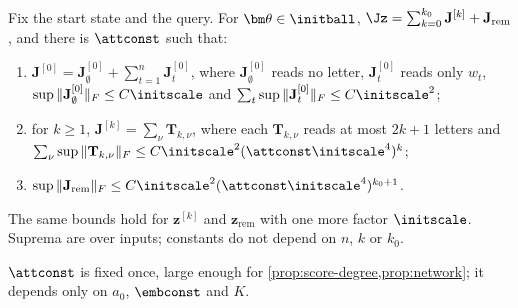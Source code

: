 \begin{proposition}
\label{prop:score-degree}
Fix the start state and the query. For $\bm\theta\in\initball$, $\Jz=\sum_{k=0}^{k_0}\mathbf J^{[k]}+\mathbf J_{\mathrm{rem}}$, and there is $\attconst$ such that:
\begin{enumerate}[label=(\roman*),leftmargin=*,itemsep=2pt,topsep=2pt]
\item $\mathbf J^{[0]}=\mathbf J^{[0]}_\emptyset+\sum_{t=1}^n\mathbf J^{[0]}_t$, where $\mathbf J^{[0]}_\emptyset$ reads no letter, $\mathbf J^{[0]}_t$ reads only $w_t$, $\sup\|\mathbf J^{[0]}_\emptyset\|_F\le C\initscale$ and
$\sum_t\sup\|\mathbf J^{[0]}_t\|_F\le C\initscale^2$;
\item for $k\ge1$, $\mathbf J^{[k]}=\sum_\nu\mathbf T_{k,\nu}$, where each $\mathbf T_{k,\nu}$ reads at most $2k+1$ letters and $\sum_\nu\sup\|\mathbf T_{k,\nu}\|_F\le C\initscale^2(\attconst\initscale^4)^k$;
\item $\sup\|\mathbf J_{\mathrm{rem}}\|_F\le C\initscale^2(\attconst\initscale^4)^{k_0+1}$.
\end{enumerate}
The same bounds hold for $\bm z^{[k]}$ and $\bm z_{\mathrm{rem}}$ with one more factor $\initscale$. Suprema are over inputs; constants do not depend on
$n$, $k$ or $k_0$.
\end{proposition}

$\attconst$ is fixed once, large enough for \cref{prop:score-degree,prop:network}; it depends only on $a_0$, $\embconst$ and $K$.

\label{app:network}


